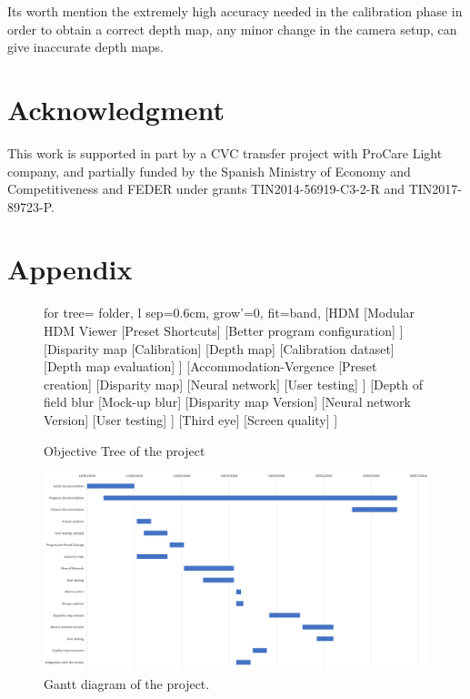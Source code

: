 \documentclass[10pt,a4paper,twocolumn,twoside]{article}
\begin{document}
	
	Its worth mention the extremely high accuracy needed in the calibration phase in order to obtain a correct depth map, any minor change in the camera setup, can give inaccurate depth maps.

	\section{Acknowledgment}
	This work is supported in part by a CVC transfer project with ProCare Light company, and partially funded by the Spanish Ministry of Economy and Competitiveness and FEDER under grants TIN2014-56919-C3-2-R and TIN2017-89723-P.
	
	
	
	
	\appendix
	
	\section*{Appendix}
	\begin{figure}
		\begin{forest}
			for tree={%
				folder,
				l sep=0.6cm,
				grow'=0,
				fit=band,
			}
			[HDM
			[Modular HDM Viewer
			[Preset Shortcuts]
			[Better program configuration]
			]
			[Disparity map
			[Calibration]
			[Depth map]
			[Calibration dataset]
			[Depth map evaluation]
			]
			[Accommodation-Vergence
			[Preset creation]
			[Disparity map]
			[Neural network]
			[User testing]
			]
			[Depth of field blur
			[Mock-up blur]
			[Disparity map Version]
			[Neural network Version]
			[User testing]
			]
			[Third eye]
			[Screen quality]
			]
		\end{forest}
		\caption{Objective Tree of the project}	
		\label{fig:objective}
	\end{figure}
	
	\begin{landscape}
		\begin{figure}
			\centering
			\includegraphics[width=1\linewidth]{img/gantt}
			\caption{Gantt diagram of the project.}
			\label{fig:gantt}
		\end{figure}
		
	\end{landscape}
	
	
	
	
\end{document}
